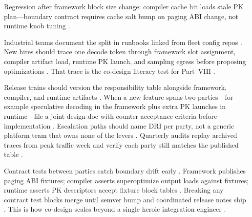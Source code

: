 \begin{example}
Regression after framework block size change: compiler cache hit loads stale PK plan---boundary contract requires cache salt bump on paging ABI change, not runtime knob tuning \citep{kwon2023vllm,yirage2026,chen2020compilerbasedhardw,patel2025llminference,memoryfloor2026,taxbreak2026,dlbook}.
\end{example}

Industrial teams document the split in runbooks linked from fleet config repos \citep{patel2025llminference,yirage2026,chen2020compilerbasedhardw,dlbook}. New hires should trace one decode token through framework slot assignment, compiler artifact load, runtime PK launch, and sampling egress before proposing optimizations \citep{kwon2023vllm,yirage2026,chen2020compilerbasedhardw,patel2025llminference,taxbreak2026,memoryfloor2026,dlbook}. That trace is the co-design literacy test for Part~VIII \citep{yirage2026,chen2020compilerbasedhardw,patel2025llminference,dlbook}.

Release trains should version the responsibility table alongside framework, compiler, and runtime artifacts \citep{patel2025llminference,yirage2026,chen2020compilerbasedhardw,kwon2023vllm,dlbook}. When a new feature spans two parties---for example speculative decoding in the framework plus extra PK launches in runtime---file a joint design doc with counter acceptance criteria before implementation \citep{patel2025llminference,kwon2023vllm,yirage2026,chen2020compilerbasedhardw,taxbreak2026,memoryfloor2026,dlbook}. Escalation paths should name DRI per party, not a generic platform team that owns none of the levers \citep{patel2025llminference,yirage2026,chen2020compilerbasedhardw,dlbook}. Quarterly audits replay archived traces from peak traffic week and verify each party still matches the published table \citep{patel2025llminference,yirage2026,chen2020compilerbasedhardw,kwon2023vllm,taxbreak2026,memoryfloor2026,dlbook}.

Contract tests between parties catch boundary drift early \citep{yirage2026,chen2020compilerbasedhardw,patel2025llminference,kwon2023vllm,dlbook}. Framework publishes paging ABI fixtures; compiler asserts superoptimize output loads against fixtures; runtime asserts PK descriptors accept fixture block tables \citep{kwon2023vllm,yirage2026,chen2020compilerbasedhardw,patel2025llminference,memoryfloor2026,taxbreak2026,dlbook}. Breaking any contract test blocks merge until semver bump and coordinated release notes ship \citep{yirage2026,chen2020compilerbasedhardw,patel2025llminference,dlbook}. This is how co-design scales beyond a single heroic integration engineer \citep{patel2025llminference,yirage2026,chen2020compilerbasedhardw,kwon2023vllm,dlbook}.


